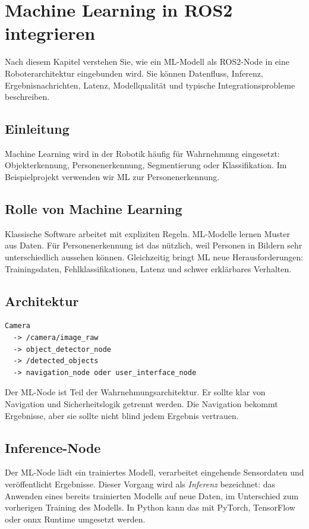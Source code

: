 \chapter{Machine Learning in ROS2 integrieren}

\begin{lernziele}
Nach diesem Kapitel verstehen Sie, wie ein ML-Modell als ROS2-Node in eine Roboterarchitektur eingebunden wird. Sie können Datenfluss, Inferenz, Ergebnisnachrichten, Latenz, Modellqualität und typische Integrationsprobleme beschreiben.
\end{lernziele}

\section{Einleitung}
Machine Learning wird in der Robotik häufig für Wahrnehmung eingesetzt: Objekterkennung, Personenerkennung, Segmentierung oder Klassifikation. Im Beispielprojekt verwenden wir ML zur Personenerkennung.

\section{Rolle von Machine Learning}
Klassische Software arbeitet mit expliziten Regeln. ML-Modelle lernen Muster aus Daten. Für Personenerkennung ist das nützlich, weil Personen in Bildern sehr unterschiedlich aussehen können. Gleichzeitig bringt ML neue Herausforderungen: Trainingsdaten, Fehlklassifikationen, Latenz und schwer erklärbares Verhalten.

\section{Architektur}
\begin{lstlisting}[style=plaintext]
Camera
  -> /camera/image_raw
  -> object_detector_node
  -> /detected_objects
  -> navigation_node oder user_interface_node
\end{lstlisting}

Der ML-Node ist Teil der Wahrnehmungsarchitektur. Er sollte klar von Navigation und Sicherheitslogik getrennt werden. Die Navigation bekommt Ergebnisse, aber sie sollte nicht blind jedem Ergebnis vertrauen.

\section{Inference-Node}
Der ML-Node lädt ein trainiertes Modell, verarbeitet eingehende Sensordaten und veröffentlicht Ergebnisse. Dieser Vorgang wird als \emph{Inferenz} bezeichnet: das Anwenden eines bereits trainierten Modells auf neue Daten, im Unterschied zum vorherigen Training des Modells. In Python kann das mit PyTorch, TensorFlow oder \gls{onnx} Runtime umgesetzt werden.

